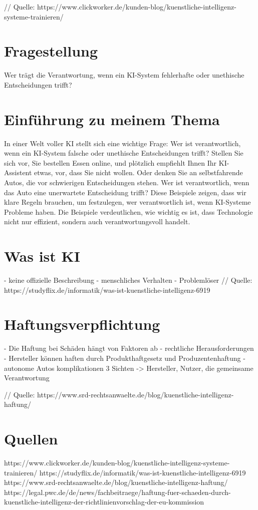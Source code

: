 \documentclass{article}
\begin{document}
    // Quelle: https://www.clickworker.de/kunden-blog/kuenstliche-intelligenz-systeme-trainieren/

\section {Fragestellung}
    Wer trägt die Verantwortung, wenn ein KI-System fehlerhafte oder unethische Entscheidungen trifft?

\section {Einführung zu meinem Thema}
In einer Welt voller KI stellt sich eine wichtige Frage: Wer ist verantwortlich, 
wenn ein KI-System falsche oder unethische Entscheidungen trifft? 
Stellen Sie sich vor, Sie bestellen Essen online, und plötzlich empfiehlt Ihnen Ihr KI-Assistent etwas, 
vor, dass Sie nicht wollen. Oder denken Sie an selbstfahrende Autos, 
die vor schwierigen Entscheidungen stehen. Wer ist verantwortlich, wenn das Auto eine unerwartete
 Entscheidung trifft? Diese Beispiele zeigen, dass wir klare Regeln brauchen, um festzulegen, wer verantwortlich ist, wenn KI-Systeme Probleme haben. 
 Die Beispiele verdeutlichen, wie wichtig es ist, dass Technologie nicht nur effizient, sondern auch verantwortungsvoll handelt.

\section {Was ist KI}
- keine offizielle Beschreibung
- menschliches Verhalten
- Problemlöser
// Quelle: https://studyflix.de/informatik/was-ist-kuenstliche-intelligenz-6919

\section {Haftungsverpflichtung}
- Die Haftung bei Schäden hängt von Faktoren ab
- rechtliche Herausforderungen
- Hersteller können haften durch Produkthaftgesetz und Produzentenhaftung
- autonome Autos komplikationen
3 Sichten -> Hersteller, Nutzer, die gemeinsame Verantwortung

// Quelle: https://www.srd-rechtsanwaelte.de/blog/kuenstliche-intelligenz-haftung/
 \section {Quellen}
 https://www.clickworker.de/kunden-blog/kuenstliche-intelligenz-systeme-trainieren/
 https://studyflix.de/informatik/was-ist-kuenstliche-intelligenz-6919
 https://www.srd-rechtsanwaelte.de/blog/kuenstliche-intelligenz-haftung/
 https://legal.pwc.de/de/news/fachbeitraege/haftung-fuer-schaeden-durch-kuenstliche-intelligenz-der-richtlinienvorschlag-der-eu-kommission

\printbibliography
\end{document}

